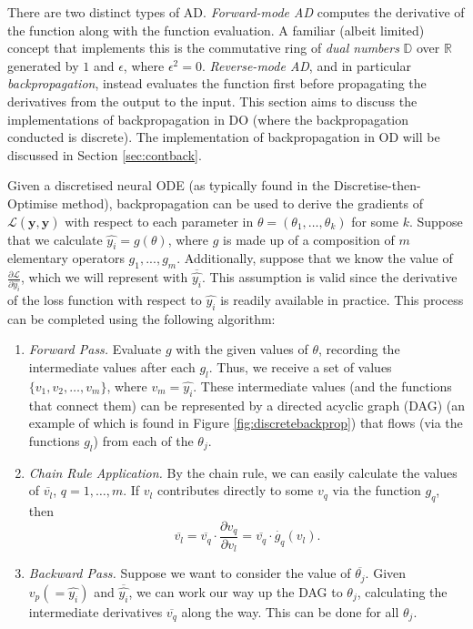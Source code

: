 \documentclass[a4paper,11pt,titlepage]{article}
\theoremstyle{definition}
\theoremstyle{plain}
\theoremstyle{remark}
\begin{document}
There are two distinct types of AD. \textit{Forward-mode AD} computes the derivative of the function along with the function evaluation. A familiar (albeit limited) concept that implements this is the commutative ring of \textit{dual numbers} $\mathbb{D}$ over $\mathbb{R}$ generated by $1$ and $\epsilon$, where $\epsilon^2 = 0$. \textit{Reverse-mode AD}, and in particular \textit{backpropagation}, instead evaluates the function first before propagating the derivatives from the output to the input. This section aims to discuss the implementations of backpropagation in DO (where the backpropagation conducted is discrete). The implementation of backpropagation in OD will be discussed in Section \ref{sec:contback}.

Given a discretised neural ODE (as typically found in the Discretise-then-Optimise method), backpropagation can be used to derive the gradients of $\mathcal{L}(\mathbf{y}, \mathbf{\hat{y}})$ with respect to each parameter in $\theta = (\theta_1, \dots, \theta_k)$ for some $k$. Suppose that we calculate $\hat{y_i} = g(\theta)$, where $g$ is made up of a composition of $m$ elementary operators $g_1, ..., g_m$. Additionally, suppose that we know the value of $\frac{\partial \mathcal{L}}{\partial \hat{y_i}}$, which we will represent with $\overline{\hat{y_i}}$. This assumption is valid since the derivative of the loss function with respect to $\hat{y_i}$ is readily available in practice. This process can be completed using the following algorithm:
\begin{enumerate}
    \item \textit{Forward Pass.} Evaluate $g$ with the given values of $\theta$, recording the intermediate values after each $g_l$. Thus, we receive a set of values $\{v_1, v_2, \dots, v_m \}$, where $v_m = \hat{y_i}$. These intermediate values (and the functions that connect them) can be represented by a directed acyclic graph (DAG) (an example of which is found in Figure \ref{fig:discretebackprop}) that flows (via the functions $g_l$) from each of the $\theta_j$.
    \item \textit{Chain Rule Application.} By the chain rule, we can easily calculate the values of $\overline{v_l}$, $q = 1, \dots, m$. If $v_l$ contributes directly to some $v_{q}$ via the function $g_q$, then
    $$
    \overline{v_l} = \overline{v_{q}} \cdot \frac{\partial v_{q}}{\partial v_l} = \overline{v_{q}} \cdot \dot{g_q}(v_l).
    $$
    \item \textit{Backward Pass.} Suppose we want to consider the value of $\overline{\theta_j}$. Given $v_p ( = \hat{y_i})$ and $\overline{\hat{y_i}}$, we can work our way up the DAG to $\theta_j$, calculating the intermediate derivatives $\overline{v_q}$ along the way. This can be done for all $\theta_j$.
\end{enumerate}
\end{document}
